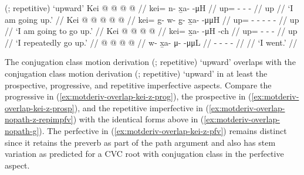 \documentclass[12pt,letterpaper,oneside,article]{memoir}
\begin{document}
\pex\label{ex:motderiv-overlap-nopath-g}%
\a\label{ex:motderiv-overlap-nopath-g-motderiv}%
%
	 (;  repetitive) ‘upward’
\a\label{ex:motderiv-overlap-nopath-g-prog}%
%
\begingl
	\gla	Kei @  @ {} @ {} @ {} //
	\glb	kei= n- x̱a-  -μH //
	\glc	up= - -  - //
	\gld	up\•  {} {} {} //
	\glft	‘I am going up.’
		//
\endgl
\a\label{ex:motderiv-overlap-nopath-g-prosp}%
%
\begingl
	\gla	Kei  @ {} @ {} @ {} @ {} @ {} //
	\glb	kei= g- w- g̱- x̱a-  -μμH //
	\glc	up= - - - -  - //
	\gld	up\•  {} {} {} {} {} //
	\glft	‘I am going to go up.’
		//
\endgl
\a\label{ex:motderiv-overlap-nopath-g-repimpfv}%
%
\begingl
	\gla	Kei @  @ {} @ {} @ {} //
	\glb	kei= x̱a-  -μH -ch //
	\glc	up= -  - - //
	\gld	up\•  {} {} {} //
	\glft	‘I repeatedly go up.’
		//
\endgl
\a\label{ex:motderiv-overlap-nopath-g-pfv}%
%
\begingl
	\gla	{} @ {} @ {} @ {} @ {} //
	\glb	w- x̱a- μ-  -μμL //
	\glc	{}- - -  - //
	\gld	{} {} {} {} {} //
	\glft	‘I went.’
		//
\endgl
\xe


The  conjugation class motion derivation  (;  repetitive) ‘upward’ overlaps with the  conjugation class motion derivation  (;  repetitive) ‘upward’ in at least the prospective, progressive, and repetitive imperfective aspects.
Compare the progressive in (\ref{ex:motderiv-overlap-kei-z-prog}), the prospective in (\ref{ex:motderiv-overlap-kei-z-prosp}), and the repetitive imperfective in (\ref{ex:motderiv-overlap-nopath-z-repimpfv}) with the identical forms above in (\ref{ex:motderiv-overlap-nopath-g}).
The perfective in (\ref{ex:motderiv-overlap-kei-z-pfv}) remains distinct since it retains the  preverb as part of the path argument and also has  stem variation as predicted for a CVC root with  conjugation class in the perfective aspect.
\end{document}
